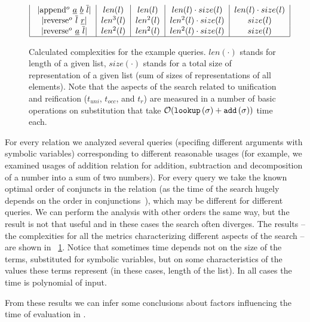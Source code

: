 \begin{figure}[t]
\[\begin{tabular}{|c|c|c|c|c|}
           \lstinline|append$^o$ $\underline{a}$ $\underline{b}$ $\overline{l}$| & $len(l)$ & $len(l)$ & $len(l) \cdot size(l)$ & $len(l) \cdot size(l)$  \\
           \lstinline|reverse$^o$ $\overline{l}$ $\underline{r}$| & $len^3(l)$ & $len^2(l)$ & $len^2(l) \cdot size(l)$ & $size(l)$  \\
           \lstinline|reverse$^o$ $\underline{a}$ $\overline{l}$| & $len^2(l)$ & $len^2(l)$ & $len^2(l) \cdot size(l)$ & $size(l)$  \\
           \hline
      \end{tabular} \]
  \caption{Calculated complexities for the example queries. $len(\cdot)$ stands for length of a given list, $size(\cdot)$ stands for a total size of representation of a given list (sum of sizes of representations of all elements). Note that the aspects of the search related to unification and reification ($t_{uni}$, $t_{occ}$, and $t_r$) are measured in a number of basic operations on substitution that take $\mathcal{O}(\texttt{lookup}\,(\sigma) + \texttt{add}\,(\sigma))$ time each. }
  \label{fig:examples_all_complexities}
\end{figure}

For every relation we analyzed several queries (specifing different arguments with symbolic variables) corresponding to different reasonable usages (for example, we examined usages of addition relation for addition, subtraction and decomposition of a number into a sum of two numbers). For every query we take the known optimal order of conjuncts in the relation (as the time of the search hugely depends on the order in conjunctions~\cite{WillThesis}), which may be different for different queries. We can perform the analysis with other orders the same way, but the result is not that useful and in these cases the search often diverges. The results -- the complexities for all the metrics characterizing different aspects of the search -- are shown in \figureword~\ref{fig:examples_all_complexities}. Notice that sometimes time depends not on the size of the terms, substituted for symbolic variables, but on some characteristics of the values these terms represent (in these cases, length of the list). In all cases the time is polynomial of input.

From these results we can infer some conclusions about factors influencing the time of evaluation in \mK.

